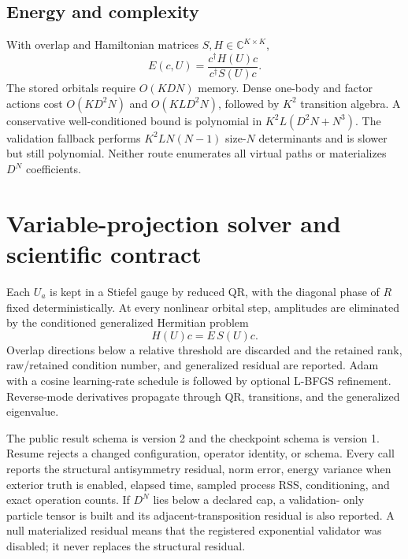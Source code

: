 \documentclass[11pt]{article}
\begin{document}
\subsection{Energy and complexity}

With overlap and Hamiltonian matrices $S,H\in\mathbb C^{K\times K}$,
\begin{equation}
 E(c,U)=\frac{c^\dagger H(U)c}{c^\dagger S(U)c}.
 \label{eq:rayleigh}
\end{equation}
The stored orbitals require $O(KDN)$ memory.  Dense one-body and factor actions
cost $O(KD^2N)$ and $O(KLD^2N)$, followed by $K^2$ transition algebra.  A
conservative well-conditioned bound is polynomial in
$K^2L(D^2N+N^3)$.  The validation fallback performs
$K^2LN(N-1)$ size-$N$ determinants and is slower but still polynomial.  Neither
route enumerates all virtual paths or materializes $D^N$ coefficients.

\section{Variable-projection solver and scientific contract}

Each $U_a$ is kept in a Stiefel gauge by reduced QR, with the diagonal phase of
$R$ fixed deterministically.  At every nonlinear orbital step, amplitudes are
eliminated by the conditioned generalized Hermitian problem
\begin{equation}
 H(U)c=E\,S(U)c.
 \label{eq:generalized-eigenproblem}
\end{equation}
Overlap directions below a relative threshold are discarded and the retained
rank, raw/retained condition number, and generalized residual are reported.
Adam with a cosine learning-rate schedule is followed by optional L-BFGS
refinement.  Reverse-mode derivatives propagate through QR, transitions, and
the generalized eigenvalue.

The public result schema is version 2 and the checkpoint schema is version 1.
Resume rejects a changed configuration, operator identity, or schema.  Every
call reports the structural antisymmetry residual, norm error, energy variance
when exterior truth is enabled, elapsed time, sampled process RSS, conditioning,
and exact operation counts.  If $D^N$ lies below a declared cap, a validation-
only particle tensor is built and its adjacent-transposition residual is also
reported.  A null materialized residual means that the registered exponential
validator was disabled; it never replaces the structural residual.
\end{document}
